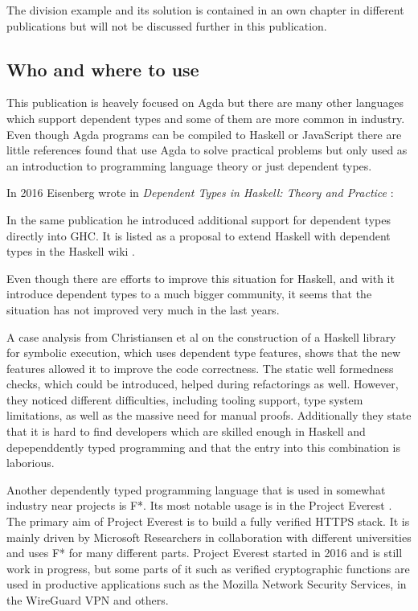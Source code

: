 The division example and its solution is contained in an own chapter in different publications \cite{10.1145/2841316, Bove2009} but will not be discussed further in this publication.

\subsection{Who and where to use}
This publication is heavely focused on Agda but there are many other languages which support dependent types and some of them are more common in industry.
Even though Agda programs can be compiled to Haskell or JavaScript there are little references found that use Agda to solve practical problems but only used as an introduction to programming language theory or just dependent types.

In 2016 Eisenberg wrote in \emph{Dependent Types in Haskell: Theory and Practice} \cite{DBLP:journals/corr/Eisenberg16}: 

In the same publication he introduced additional support for dependent types directly into GHC. It is listed as a proposal to extend Haskell with dependent types in the Haskell wiki \cite{haskell_wiki}.

Even though there are efforts to improve this situation for Haskell, and with it introduce dependent types to a much bigger community, it seems that the situation has not improved very much in the last years.

A case analysis from Christiansen et al \cite{10.1145/3341704} on the construction of a Haskell library for symbolic execution, which uses dependent type features, shows that the new features allowed it to improve the code correctness. The static well formedness checks, which could be introduced, helped during refactorings as well. However, they noticed different difficulties, including tooling support, type system limitations, as well as the massive need for manual proofs. Additionally they state that it is hard to find developers which are skilled enough in Haskell and depependdently typed programming and that the entry into this combination is laborious.

Another dependently typed programming language that is used in somewhat industry near projects is F*. 
Its most notable usage is in the Project Everest \cite{project_everest_github_io}. The primary aim of Project Everest is to build a fully verified HTTPS stack.
It is mainly driven by Microsoft Researchers in collaboration with different universities and uses F* for many different parts.
Project Everest started in 2016 and is still work in progress, but some parts of it such as verified cryptographic functions are used in productive applications such as the Mozilla Network Security Services\cite{project_everest_slides},  in the WireGuard VPN and others.
